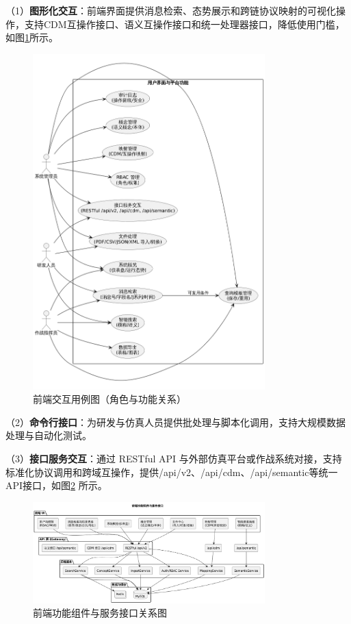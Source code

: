 （1）\textbf{图形化交互}：前端界面提供消息检索、态势展示和跨链协议映射的可视化操作，支持CDM互操作接口、语义互操作接口和统一处理器接口，降低使用门槛，如图\ref{fig_usecase_frontend}所示。
\begin{figure}[H]
    \centering
    \includegraphics[width=0.8\textwidth,height=0.5\textheight,keepaspectratio]{chapters/fig-0/usecase_frontend.png}
    \caption{前端交互用例图（角色与功能关系）}
    \label{fig_usecase_frontend}
  \end{figure}
（2）\textbf{命令行接口}：为研发与仿真人员提供批处理与脚本化调用，支持大规模数据处理与自动化测试。

（3）\textbf{接口服务交互}：通过 RESTful API 与外部仿真平台或作战系统对接，支持标准化协议调用和跨域互操作，提供/api/v2、/api/cdm、/api/semantic等统一API接口，如图\ref{fig_component_frontend} 所示。



\begin{figure}[H]
  \centering
  \includegraphics[width=0.8\textwidth,height=0.5\textheight,keepaspectratio]{chapters/fig-0/component_frontend.png}
  \caption{前端功能组件与服务接口关系图}
  \label{fig_component_frontend}
\end{figure}


